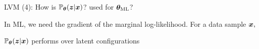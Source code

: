 \documentclass[handout,fleqn,aspectratio=169]{beamer}
\begin{document}
\begin{frame}{LVM (4): How is $\mathbb{P}_{\bm{\theta}}( \bm{z} | \bm{x} )$? used for $\bm{\theta}_{\text{ML}}$?}

\plitemsep 0.2in

\bci 

\item In ML, we need the gradient of the marginal log-likelihood. For a data sample $\bm{x},$

\item $\mathbb{P}_{\bm{\theta}}( \bm{z} | \bm{x} )$ performs  over latent configurations
\eci
\end{frame}










\end{document}
